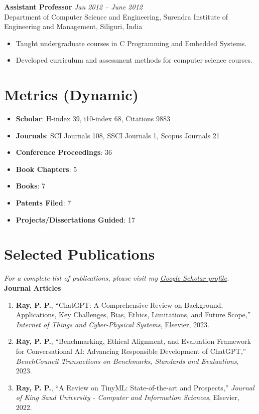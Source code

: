 \documentclass[10pt,a4paper]{article}
\begin{document}
	\textbf{Assistant Professor} \hfill \textit{Jan 2012 -- June 2012}\\
	Department of Computer Science and Engineering, Surendra Institute of Engineering and Management, Siliguri, India
	\begin{itemize}[leftmargin=0.2in]
		\item Taught undergraduate courses in C Programming and Embedded Systems.
		\item Developed curriculum and assessment methods for computer science courses.
	\end{itemize}
	
	\section*{Metrics (Dynamic)}
	
	\begin{itemize}[leftmargin=0.2in]
		\item \textbf{Scholar}: H-index 39, i10-index 68, Citations 9883
		\item \textbf{Journals}: SCI Journals 108, SSCI Journals 1, Scopus Journals 21
		\item \textbf{Conference Proceedings}: 36
		\item \textbf{Book Chapters}: 5  
		\item \textbf{Books}: 7
		\item \textbf{Patents Filed}: 7
		\item \textbf{Projects/Dissertations Guided}: 17
	\end{itemize}
	
	\section*{Selected Publications}
	\textit{For a complete list of publications, please visit my \href{https://scholar.google.co.in/citations?user=ioplfagAAAAJ&hl=en&oi=ao}{Google Scholar profile}.}\\
	\textbf{Journal Articles}
	\begin{enumerate}[leftmargin=0.2in]
		\item \textbf{Ray, P. P.}, “ChatGPT: A Comprehensive Review on Background, Applications, Key Challenges, Bias, Ethics, Limitations, and Future Scope,” \textit{Internet of Things and Cyber-Physical Systems}, Elsevier, 2023.
		\item \textbf{Ray, P. P.}, “Benchmarking, Ethical Alignment, and Evaluation Framework for Conversational AI: Advancing Responsible Development of ChatGPT,” \textit{BenchCouncil Transactions on Benchmarks, Standards and Evaluations}, 2023.
		\item \textbf{Ray, P. P.}, “A Review on TinyML: State-of-the-art and Prospects,” \textit{Journal of King Saud University - Computer and Information Sciences}, Elsevier, 2022.
		
	\end{enumerate}
	
\end{document}

